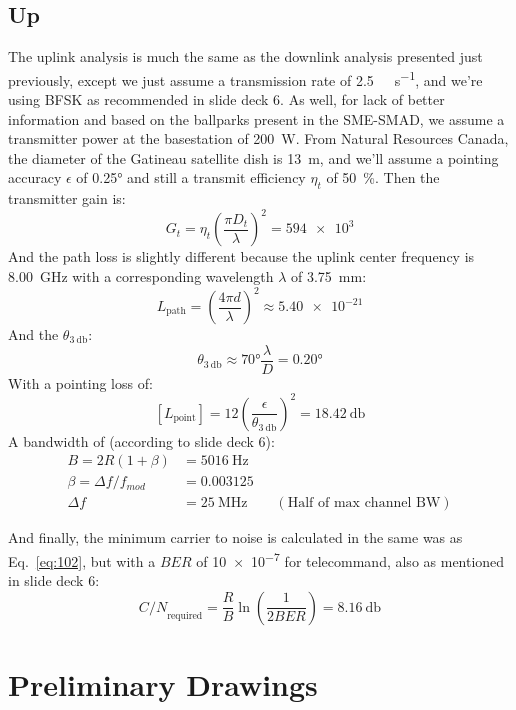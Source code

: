 \documentclass[9pt]{article}
\begin{document}
\subsection{Up}
The uplink analysis is much the same as the downlink analysis presented just previously, except we just assume a transmission rate of \qty{2.5}{\kilo\bit\per\second}, and we're using BFSK as recommended in slide deck 6.
As well, for lack of better information and based on the ballparks present in the SME-SMAD, we assume a transmitter power at the basestation of \qty{200}{\watt}.
From Natural Resources Canada, the diameter of the Gatineau satellite dish is \qty{13}{\meter}, and we'll assume a pointing accuracy $\epsilon$ of \ang{0.25} and still a transmit efficiency $\eta_t$ of \qty{50}{\percent}.
Then the transmitter gain is:
\begin{equation}\label{eq:200}
  G_t=\eta_t\left(\frac{\pi D_t}{\lambda}\right)^2=\num{594e3}
\end{equation}
And the path loss is slightly different because the uplink center frequency is \qty{8.00}{\giga\hertz} with a corresponding wavelength $\lambda$ of \qty{3.75}{\milli\meter}:
\begin{equation}\label{eq:203}
  L_\text{path}=\left(\frac{4\pi d}{\lambda}\right)^2\approx\num{5.40e-21}
\end{equation}
And the $\theta_{\qty{3}{\decibel}}$:
\begin{equation}
  \theta_{\qty{3}{\decibel}}\approx\ang{70}\frac{\lambda}{D}=\ang{0.20}
\end{equation}
With a pointing loss of:
\begin{equation}\label{eq:303}
  [L_\text{point}]=12\left(\frac{\epsilon}{\theta_{\qty{3}{\decibel}}}\right)^2=\qty{18.42}{\decibel}
\end{equation}
A bandwidth of (according to slide deck 6):
\begin{align}
  B =2R(1+\beta)&=\qty{5016}{\hertz}\\\label{eq:201}
  \beta =\Delta f/f_{mod}&=\num{0.003125}\\
  \Delta f&=\qty{25}{\mega\hertz}\qquad(\text{Half of max channel BW})
\end{align}

And finally, the minimum carrier to noise is calculated in the same was as Eq.~\ref{eq:102}, but with a ${BER}$ of \num{10e-7} for telecommand, also as mentioned in slide deck 6:
\begin{equation}\label{eq:202}
  {C/N}_\text{required}=\frac RB\ln\left(\frac{1}{2{BER}}\right)=\qty{8.16}{\decibel}
\end{equation}



\vfill
\section{Preliminary Drawings}\label{app:julia}
\end{document}
